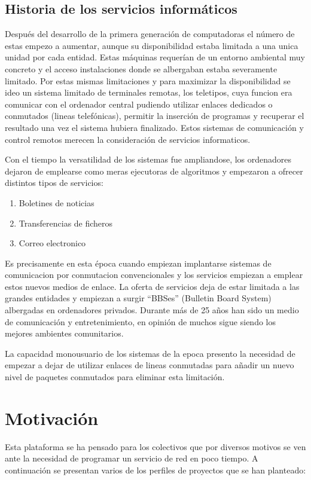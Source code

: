 \documentclass[a4paper,spanish,12pt]{book}
\begin{document}
\section{Historia de los servicios informáticos}
Despu\'es del desarrollo de la primera generación de computadoras el número de estas empezo a aumentar, aunque su disponibilidad estaba limitada a una unica unidad por cada entidad. Estas máquinas requerían de un entorno ambiental muy concreto y el acceso instalaciones donde se albergaban estaba severamente limitado. Por estas mismas limitaciones y para maximizar la disponibilidad se ideo un sistema limitado de terminales remotas, los teletipos, cuya funcion era comunicar con el ordenador central pudiendo utilizar enlaces dedicados o conmutados (lineas telefónicas), permitir la inserción de programas y recuperar el resultado una vez el sistema hubiera finalizado. Estos sistemas de comunicación y control remotos merecen la consideración de servicios informaticos.

Con el tiempo la versatilidad de los sistemas fue ampliandose, los ordenadores dejaron de emplearse como meras ejecutoras de algoritmos y empezaron a ofrecer distintos tipos de servicios:
\begin{enumerate}
	\item Boletines de noticias
	\item Transferencias de ficheros
	\item Correo electronico
\end{enumerate}
Es precisamente en esta \'epoca cuando empiezan implantarse sistemas de comunicacion por conmutacion convencionales y los servicios empiezan a emplear estos nuevos medios de enlace. La oferta de servicios deja de estar limitada a las grandes entidades y empiezan a surgir ``BBSes'' (Bulletin Board System) albergadas en ordenadores privados. Durante más de 25 años han sido un medio de comunicación y entretenimiento, en opinión de muchos sigue siendo los mejores ambientes comunitarios. 

La capacidad monousuario de los sistemas de la epoca presento la necesidad de empezar a dejar de utilizar enlaces de lineas conmutadas para añadir un nuevo nivel de paquetes conmutados para eliminar esta limitación.



\chapter{Motivación}
Esta plataforma se ha pensado para los colectivos que por diversos motivos se ven ante la necesidad de programar un servicio de red en poco tiempo. A continuaci\'on se presentan varios de los perfiles de proyectos que se han planteado:
\end{document}
